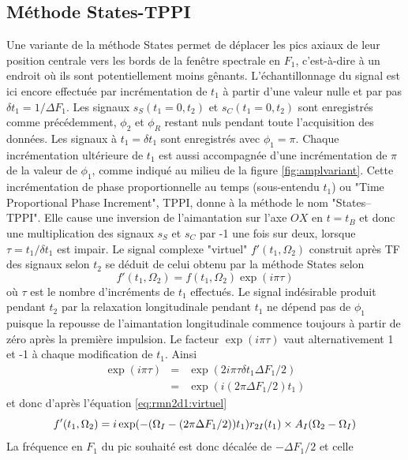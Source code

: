 \subsection{Méthode States-TPPI}
\label{sec:2d:cosy1noyau:st}
Une variante de la méthode States permet de déplacer les pics axiaux de leur position
centrale vers les bords de la fenêtre spectrale en $F_1$, c'est-à-dire
à un endroit où ils sont potentiellement moins gênants.
L'échantillonnage du signal est ici encore effectuée
par incrémentation de $t_1$ à partir d'une valeur nulle et par pas $\delta t_1 = 1/\Delta F_1$.
Les signaux $s_S(t_1 = 0, t_2)$ et $s_C(t_1 = 0, t_2)$
sont enregistrés comme précédemment,
$\phi_2$ et $\phi_R$ restant nuls pendant toute l'acquisition des données.
Les signaux à $t_1 = \delta t_1$ sont enregistrés avec $\phi_1 = \pi$.
Chaque incrémentation ultérieure de $t_1$ est aussi accompagnée d'une incrémentation de $\pi$
de la valeur de $\phi_1$, comme indiqué au milieu de la figure \ref{fig:amplvariant}.
Cette incrémentation de phase proportionnelle au temps (sous-entendu $t_1$)
ou "Time Proportional Phase Increment", TPPI, donne à la méthode le nom "States--TPPI".
Elle cause une inversion de l'aimantation sur l'axe $OX$ en $t=t_B$
et donc une multiplication des signaux $s_S$ et $s_C$
par -1 une fois sur deux, lorsque $\tau = t_1/\delta t_1$ est impair.
Le signal complexe "virtuel" $f'(t_1, \Omega_2)$ construit après TF des signaux selon $t_2$
se déduit de celui obtenu par la méthode States selon
\begin{equation}
f'(t_1, \Omega_2) = f(t_1, \Omega_2) \exp(i \pi \tau)
\end{equation}
où $\tau$ est le nombre d'incréments de $t_1$ effectués.
Le signal indésirable produit pendant $t_2$
par la relaxation longitudinale pendant $t_1$
ne dépend pas de $\phi_1$ puisque la repousse de l'aimantation longitudinale
commence toujours à partir de zéro après la première impulsion.
Le facteur $\exp(i \pi \tau)$ vaut alternativement 1 et -1 à chaque modification de $t_1$.
Ainsi
\begin{eqnarray}
\exp(i \pi \tau) & = & \exp(2 i \pi \tau \delta t_1 \Delta F_1 / 2) \\
              & = & \exp(i(2\pi\Delta F_1 / 2) t_1)
\end{eqnarray}
et donc d'après l'équation \ref{eq:rmn2d1:virtuel}
\begin{equation}
f'(t_1, \Omega_2) = i \exp(-(\Omega_I-(2\pi\Delta F_1 / 2)) t_1) r_{2I}(t_1) \times A_I(\Omega_2-\Omega_I)
\end{equation}
La fréquence en $F_1$ du pic souhaité est donc décalée de $-\Delta F_1/2$ et celle
